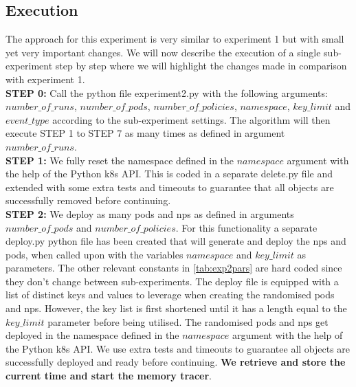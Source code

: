 \subsection{Execution} \label{exp2:execution}
The approach for this experiment is very similar to experiment 1 but with small yet very important changes.  We will now describe the execution of a single sub-experiment step by step where we will highlight the changes made in comparison with experiment 1.
\\[10pt]

\textbf{STEP 0:} Call the python file experiment2.py with the following arguments: $number\_of\_runs$, $number\_of\_pods$, $number\_of\_policies$, $namespace$, $key\_limit$ and $event\_type$ according to the sub-experiment settings. The algorithm will then execute STEP 1 to STEP 7 as many times as defined in argument $number\_of\_runs$.
\\[10pt]

\textbf{STEP 1:} We fully reset the namespace defined in the $namespace$ argument with the help of the Python \acrshort{k8s} API. This is coded in a separate delete.py file and extended with some extra tests and timeouts to guarantee that all objects are successfully removed before continuing.
\\[10pt]

\textbf{STEP 2:} We deploy as many pods and \acrshort{np}s as defined in arguments \newline $number\_of\_pods$ and $number\_of\_policies$. For this functionality a separate deploy.py python file has been created that will generate and deploy the \acrshort{np}s and pods, when called upon with the variables $namespace$ and $key\_limit$ as parameters. The other relevant constants in \autoref{tab:exp2pars} are hard coded since they don't change between sub-experiments. The deploy file is equipped with a list of distinct keys and values to leverage when creating the randomised pods and \acrshort{np}s. However, the key list is first shortened until it has a length equal to the $key\_limit$ parameter before being utilised. The randomised pods and \acrshort{np}s get deployed in the namespace defined in the $namespace$ argument with the help of the Python \acrshort{k8s} API. We use extra tests and timeouts to guarantee all objects are successfully deployed and ready before continuing. 
\textbf{We retrieve and store the current time and start the memory tracer}.
\\[10pt]

